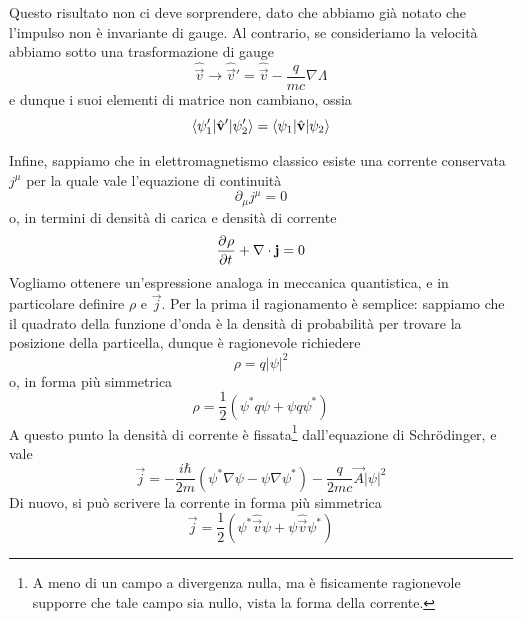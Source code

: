 \documentclass[a4paper, 11pt]{article}
\newcommand{\op}[1]{\hat{#1}}
\renewcommand{\op}[1]{\hat{#1}}
\begin{document}
Questo risultato non ci deve sorprendere, dato che abbiamo già notato che l'impulso non è invariante di gauge. Al contrario, se consideriamo la velocità abbiamo sotto una trasformazione di gauge
\[\op{\vec{v}}\to\op{\vec{v}}'=\op{\vec{v}}-\frac{q}{mc}\nabla\Lambda\]
e dunque i suoi elementi di matrice non cambiano, ossia
\[\braketop{\psi_1'}{\op{\vec{v}}'}{\psi_2'}=\braketop{\psi_1}{\op{\vec{v}}}{\psi_2}\]

Infine, sappiamo che in elettromagnetismo classico esiste una corrente conservata $j^\mu$ per la quale vale l'equazione di continuità
\[\partial_\mu j^\mu=0\]
o, in termini di densità di carica e densità di corrente
\[\pder{\rho}{t}+\nabla\cdot\vec{j}=0\]
Vogliamo ottenere un'espressione analoga in meccanica quantistica, e in particolare definire $\rho$ e $\vec{j}$. Per la prima il ragionamento è semplice: sappiamo che il quadrato della funzione d'onda è la densità di probabilità per trovare la posizione della particella, dunque è ragionevole richiedere
\[\rho=q|\psi|^2\]
o, in forma più simmetrica
\[\rho=\frac{1}{2}\left(\psi^*q\psi+\psi q\psi^*\right)\]
A questo punto la densità di corrente è fissata\footnote{A meno di un campo a divergenza nulla, ma è fisicamente ragionevole supporre che tale campo sia nullo, vista la forma della corrente.} dall'equazione di Schr\"odinger, e vale
\[\vec{j}=-\frac{i\hbar}{2m}\left(\psi^*\nabla\psi-\psi\nabla\psi^*\right)-\frac{q}{2mc}\vec{A}|\psi|^2\]
Di nuovo, si può scrivere la corrente in forma più simmetrica
\[\vec{j}=\frac{1}{2}\left(\psi^*\op{\vec{v}}\psi+\psi\op{\vec{v}}\psi^*\right)\]
\end{document}
